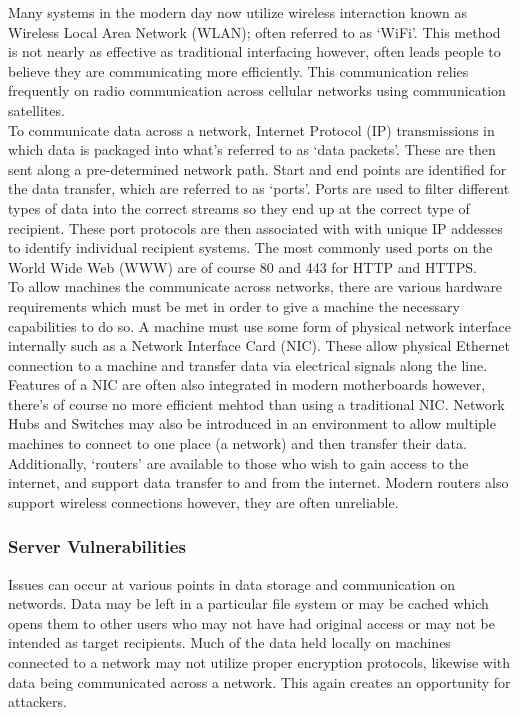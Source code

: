 \documentclass[11pt, english]{article}
\begin{document}
	Many systems in the modern day now utilize wireless interaction known as Wireless Local Area Network (WLAN); often referred to as `WiFi'. This method is not nearly as effective as traditional interfacing however, often leads people to believe they are communicating more efficiently. This communication relies frequently on radio communication across cellular networks using communication satellites.\\

	To communicate data across a network, Internet Protocol (IP) transmissions in which data is packaged into what's referred to as `data packets'. These are then sent along a pre-determined network path. Start and end points are identified for the data transfer, which are referred to as `ports'. Ports are used to filter different types of data into the correct streams so they end up at the correct type of recipient. These port protocols are then associated with with unique IP addesses to identify individual recipient systems. The most commonly used ports on the World Wide Web (WWW) are of course 80 and 443 for HTTP and HTTPS.\\

	To allow machines the communicate across networks, there are various hardware requirements which must be met in order to give a machine the necessary capabilities to do so. A machine must use some form of physical network interface internally such as a Network Interface Card (NIC). These allow physical Ethernet connection to a machine and transfer data via electrical signals along the line. Features of a NIC are often also integrated in modern motherboards however, there's of course no more efficient mehtod than using a traditional NIC. Network Hubs and Switches may also be introduced in an environment to allow multiple machines to connect to one place (a network) and then transfer their data. Additionally, `routers' are available to those who wish to gain access to the internet, and support data transfer to and from the internet. Modern routers also support wireless connections however, they are often unreliable.

		\subsubsection{Server Vulnerabilities}

	Issues can occur at various points in data storage and communication on networds. Data may be left in a particular file system or may be cached which opens them to other users who may not have had original access or may not be intended as target recipients. Much of the data held locally on machines connected to a network may not utilize proper encryption protocols, likewise with data being communicated across a network. This again creates an opportunity for attackers.\\
\end{document}
